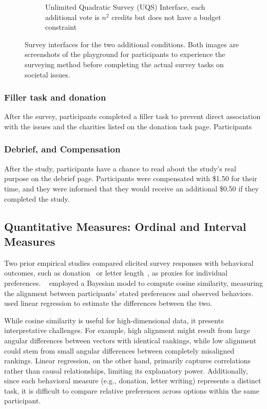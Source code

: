 \begin{figure}
\begin{subfigure}{0.47\textwidth}
        \caption{Unlimited Quadratic Survey (UQS) Interface, each additional vote is $n^2$ credits but does not have a budget constraint}
        \label{fig:css_interface}
    \end{subfigure}
    \caption{Survey interfaces for the two additional conditions. Both images are screenshots of the playground for participants to experience the surveying method before completing the actual survey tasks on societal issues.}
    \label{fig:extended_interface}
\end{figure}


\subsubsection{Filler task and donation}
After the survey, participants completed a filler task to prevent direct association with the issues and the charities listed on the donation task page. Participants 

\subsubsection{Debrief, and Compensation}
After the study, participants have a chance to read about the study's real purpose on the debrief page. Participants were compensated with \$1.50 for their time, and they were informed that they would receive an additional \$0.50 if they completed the study.

\subsection{Quantitative Measures: Ordinal and Interval Measures}
\label{sec:quantitative_measures}
Two prior empirical studies compared elicited survey responses with behavioral outcomes, such as donation~\cite{chengCanShowWhat2021,cavaille2024cares} or letter length~\cite{cavaille2024cares}, as proxies for individual preferences. ~\citet{chengCanShowWhat2021} employed a Bayesian model to compute cosine similarity, measuring the alignment between participants' stated preferences and observed behaviors. ~\citet{cavaille2024cares} used linear regression to estimate the differences between the two.

While cosine similarity is useful for high-dimensional data, it presents interpretative challenges. For example, high alignment might result from large angular differences between vectors with identical rankings, while low alignment could stem from small angular differences between completely misaligned rankings. Linear regression, on the other hand, primarily captures correlations rather than causal relationships, limiting its explanatory power. Additionally, since each behavioral measure (e.g., donation, letter writing) represents a distinct task, it is difficult to compare relative preferences across options within the same participant.

